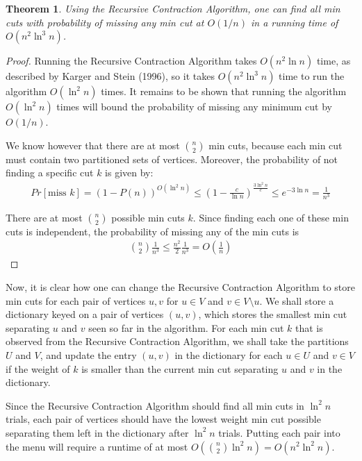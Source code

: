 \documentclass{article}
\theoremstyle{plain}
\newtheorem{theorem}{Theorem}
\begin{document}
\begin{theorem}
Using the Recursive Contraction Algorithm, one can find all min cuts with probability of missing any min cut at $O(1/n)$ in a running time of $O(n^2 \ln^3 n)$.
\end{theorem}
\begin{proof}
Running the Recursive Contraction Algorithm takes $O(n^2 \ln n)$ time, as described by Karger and Stein (1996), so it takes $O(n^2 \ln^3 n)$ time to run the algorithm $O( \ln^2 n)$ times. It remains to be shown that running the algorithm $O(\ln^2 n)$ times will bound the probability of missing any minimum cut by $O(1/n)$.

We know however that there are at most ${n \choose 2}$ min cuts, because each min cut must contain two partitioned sets of vertices. Moreover, the probability of not finding a specific cut $k$ is given by:
\begin{eqnarray}
  Pr[\textrm{miss }k] = (1 - P(n))^{O( \ln^2 n)} \leq \left(1 - \frac{c}{\ln n} \right)^{\frac{3 \ln^2 n}{c}} \leq e^{-3 \ln n} = \frac{1}{n^3}
\end{eqnarray}

There are at most ${n \choose 2}$ possible min cuts $k$. Since finding each one of these min cuts is independent, the probability of missing any of the min cuts is
\begin{eqnarray}
  {n \choose 2} \frac{1}{n^3} \leq \frac{n^2}{2} \frac{1}{n^3} = O \left( \frac{1}{n} \right)
\end{eqnarray}
\end{proof}

Now, it is clear how one can change the Recursive Contraction Algorithm to store min cuts for each pair of vertices $u,v$ for $u \in V$ and $v \in V \setminus u$. We shall store a dictionary keyed on a pair of vertices $(u,v)$, which stores the smallest min cut separating $u$ and $v$ seen so far in the algorithm. For each min cut $k$ that is observed from the Recursive Contraction Algorithm, we shall take the partitions $U$ and $V$, and update the entry $(u,v)$ in the dictionary for each $u \in U$ and $v \in V$ if the weight of $k$ is smaller than the current min cut separating $u$ and $v$ in the dictionary.

Since the Recursive Contraction Algorithm should find all min cuts in $\ln^2 n$ trials, each pair of vertices should have the lowest weight min cut possible separating them left in the dictionary after $\ln^2 n$ trials. Putting each pair into the menu will require a runtime of at most $O \left( {n \choose 2} \ln^2 n \right) = O(n^2 \ln^2 n)$.
\end{document}
